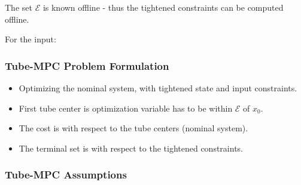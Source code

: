 \documentclass[8pt,a4paper]{scrartcl}
\begin{document}
\begin{multicols*}{3}
\begin{multicols*}{4}

The set $\mathcal{E}$ is known offline - thus the tightened constraints can be computed offline.

\finn

For the input:


\mportant{$[a,b]\ominus[c,d]=[a-c,b-d]$}

\subsubsection{Tube-MPC Problem Formulation}


\begin{itemize}

\item Optimizing the nominal system, with tightened state and input constraints.
\item First tube center is optimization variable \dahe has to be within $\mathcal{E}$ of $x_0$.
\item The cost is with respect to the tube centers (nominal system).
\item The terminal set is with respect to the tightened constraints.
\end{itemize}

\subsubsection{Tube-MPC Assumptions}


\end{multicols*}
\end{multicols*}
\end{document}
